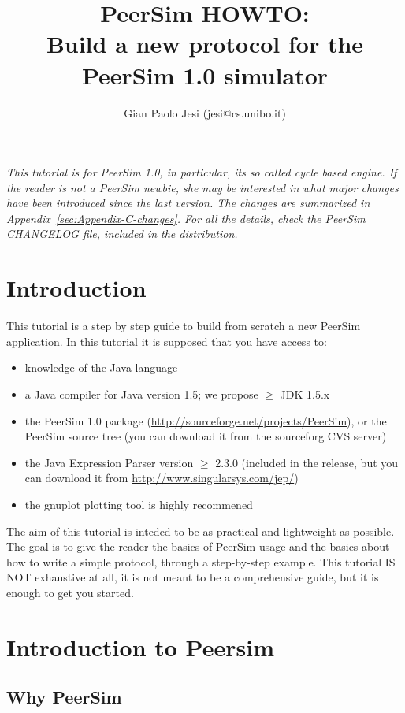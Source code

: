 \documentclass[a4paper,11pt]{article}
\title{PeerSim HOWTO:\\ Build a new protocol for the PeerSim 1.0 simulator}
\author{Gian Paolo Jesi (jesi@cs.unibo.it)}
\begin{document}
\maketitle


\noindent\emph{This tutorial is for PeerSim 1.0, in particular, its so called
cycle based engine.
If the reader is not a PeerSim newbie, she may be
interested in what major changes have been introduced since the last version.
The changes are summarized in Appendix~\ref{sec:Appendix-C-changes}.
For all the details, check the PeerSim CHANGELOG file, included in the
distribution.}

\section{Introduction}


This tutorial is a step by step guide to build from
scratch a new PeerSim application.
In this tutorial it is supposed that you have access to: 

\begin{itemize}
\item knowledge of the Java language
\item a Java compiler for Java version 1.5; we propose $\geq$ JDK 1.5.x
\item the PeerSim 1.0 package (\url{http://sourceforge.net/projects/PeerSim}), 
or the PeerSim source tree (you can download it from the sourceforg CVS server)
\item the Java Expression Parser version $\geq$ 2.3.0
(included in the release, but you can download it from
\url{http://www.singularsys.com/jep/})
\item the gnuplot plotting tool is highly recommened 
\end{itemize}

The aim of this tutorial is inteded to be
as practical and lightweight as possible.
The goal is to give the reader the basics
of PeerSim usage and the basics about how to write a simple protocol,
through a step-by-step example.
This tutorial IS NOT exhaustive at all, it is not meant to be a comprehensive
guide, but it is enough to get you started.


\section{Introduction to Peersim}


\subsection{Why PeerSim}
\end{document}
